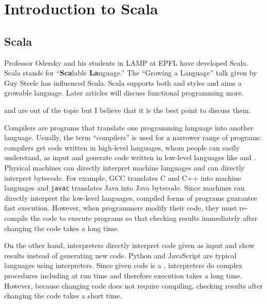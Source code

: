 \setchapterpreamble[u]{\margintoc}
\chapter{Introduction to Scala}

\section{Scala}

Professor Odersky and his students in LAMP at EPFL have developed Scala. Scala
stands for ``\textbf{Sca}lable \textbf{La}nguage.'' The
``Growing a Language''
talk given by Guy Steele has influenced Scala.
Scala supports both  and  styles and aims a
growable language. Later articles will discuss functional programming more.

\begin{kaobox}[frametitle=Compilers and interpreters]
 and  are out of the topic but I believe that it is
the best point to discuss them.

Compilers are programs that translate one programming language into another
language. Usually, the term ``compilers'' is used for a narrower range of
programs: compilers get code written in high-level languages, whom people can
easily understand, as input and generate code written in low-level languages
like  and . Physical machines can directly
interpret machine languages and  can directly interpret
bytecode. For example, GCC translates C and C++ into machine languages and
\verb+javac+ translates Java into Java bytecode. Since machines can directly
interpret the low-level languages, compiled forms of programs guarantee fast
execution. However, when programmers modify their code, they must re-compile
the code to execute programs so that checking results immediately after
changing the code takes a long time.

On the other hand, interpreters directly interpret code given as input and
show results instead of generating new code. Python and JavaScript are typical
languages using interpreters. Since given code is a , interpreters do
complex procedures including  at run time and therefore execution
takes a long time. However, because changing code does not require compiling,
checking results after changing the code takes a short time.
\end{kaobox}

